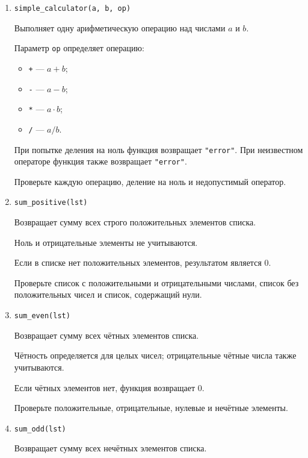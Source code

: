 \begin{enumerate}
Гарантируется, что \texttt{month} находится в диапазоне от 1 до 12.
Поведение при других значениях не определено и в тестах не проверяется.

Проверьте все месяцы, включая месяцы, являющиеся границами сезонов.

\item \texttt{simple\_calculator(a, b, op)}

Выполняет одну арифметическую операцию над числами $a$ и $b$.

Параметр \texttt{op} определяет операцию:
\begin{itemize}
    \item \texttt{+} --- $a+b$;
    \item \texttt{-} --- $a-b$;
    \item \texttt{*} --- $a\cdot b$;
    \item \texttt{/} --- $a/b$.
\end{itemize}

При попытке деления на ноль функция возвращает \texttt{"error"}.
При неизвестном операторе функция также возвращает \texttt{"error"}.

Проверьте каждую операцию, деление на ноль и недопустимый оператор.

\item \texttt{sum\_positive(lst)}

Возвращает сумму всех строго положительных элементов списка.

Ноль и отрицательные элементы не учитываются.

Если в списке нет положительных элементов, результатом является $0$.

Проверьте список с положительными и отрицательными числами, список без
положительных чисел и список, содержащий нули.

\item \texttt{sum\_even(lst)}

Возвращает сумму всех чётных элементов списка.

Чётность определяется для целых чисел; отрицательные чётные числа также
учитываются.

Если чётных элементов нет, функция возвращает $0$.

Проверьте положительные, отрицательные, нулевые и нечётные элементы.

\item \texttt{sum\_odd(lst)}

Возвращает сумму всех нечётных элементов списка.


\end{enumerate}
